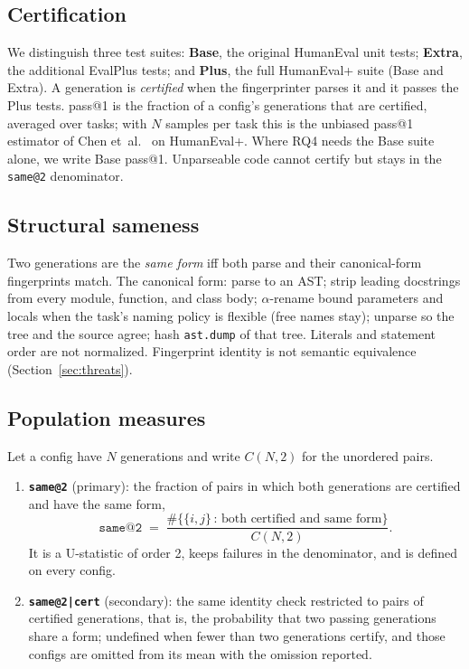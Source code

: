 \documentclass[acmsmall,screen,review,anonymous]{acmart}
\makeatletter
\newcommand{\sameat}{\mbox{\texttt{same@2}}}
\newcommand{\sameatc}{\mbox{\texttt{same@2|cert}}}
\newcommand{\etal}{et~al.}
\makeatother
\begin{document}
\subsection{Certification}
\label{sec:certification}
We distinguish three test suites: \textbf{Base}, the original HumanEval unit
tests; \textbf{Extra}, the additional EvalPlus tests; and \textbf{Plus}, the
full HumanEval+ suite (Base and Extra).
A generation is \emph{certified} when the fingerprinter parses it and it
passes the Plus tests.
pass@1 is the fraction of a config's generations that are certified, averaged
over tasks; with $N$ samples per task this is the unbiased pass@1 estimator of
Chen \etal{}~\cite{chen2021evaluating} on HumanEval+.
Where RQ4 needs the Base suite alone, we write Base pass@1.
Unparseable code cannot certify but stays in the \sameat{} denominator.

\subsection{Structural sameness}
\label{sec:sameness}
Two generations are the \emph{same form} iff both parse and their
canonical-form fingerprints match.
The canonical form: parse to an AST; strip leading docstrings from every
module, function, and class body; $\alpha$-rename bound parameters and locals
when the task's naming policy is flexible (free names stay); unparse so the
tree and the source agree; hash \texttt{ast.dump} of that tree.
Literals and statement order are not normalized.
Fingerprint identity is not semantic equivalence (Section~\ref{sec:threats}).

\subsection{Population measures}
\label{sec:measures}
Let a config have $N$ generations and write $C(N,2)$ for the unordered pairs.

\begin{enumerate}
  \item \textbf{\sameat{}} (primary): the fraction of pairs in which both
        generations are certified and have the same form,
        \[
          \texttt{same@2}
          \;=\;
          \frac{\#\{\{i,j\}\,:\,\text{both certified and same form}\}}{C(N,2)}.
        \]
        It is a U-statistic of order 2, keeps failures in the denominator,
        and is defined on every config.
  \item \textbf{\sameatc{}} (secondary): the same identity check restricted to
        pairs of certified generations, that is, the probability that two
        passing generations share a form; undefined when fewer than two
        generations certify, and those configs are omitted from its mean with
        the omission reported.
\end{enumerate}
\end{document}
